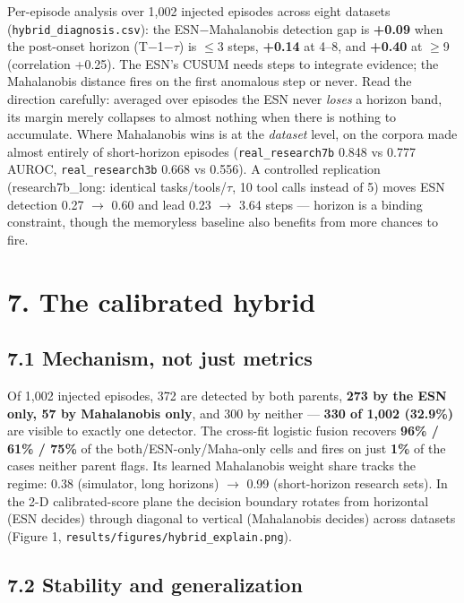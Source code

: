 \documentclass[11pt]{article}
\begin{document}
Per-episode analysis over 1,002 injected episodes across eight datasets (\texttt{hybrid\_\allowbreak{}diagnosis.csv}): the ESN$-$Mahalanobis detection gap is \textbf{+0.09} when the post-onset horizon (T$-$1$-$$\tau$) is $\leq$3 steps, \textbf{+0.14} at 4--8, and \textbf{+0.40} at $\geq$9 (correlation +0.25). The ESN's CUSUM needs steps to integrate evidence; the Mahalanobis distance fires on the first anomalous step or never. Read the direction carefully: averaged over episodes the ESN never \emph{loses} a horizon band, its margin merely collapses to almost nothing when there is nothing to accumulate. Where Mahalanobis wins is at the \emph{dataset} level, on the corpora made almost entirely of short-horizon episodes (\texttt{real\_\allowbreak{}research7b} 0.848 vs 0.777 AUROC, \texttt{real\_\allowbreak{}research3b} 0.668 vs 0.556). A controlled replication (research7b\_long: identical tasks/tools/$\tau$, 10 tool calls instead of 5) moves ESN detection 0.27 $\rightarrow$ 0.60 and lead 0.23 $\rightarrow$ 3.64 steps --- horizon is a binding constraint, though the memoryless baseline also benefits from more chances to fire.


\section{7. The calibrated hybrid}


\subsection{7.1 Mechanism, not just metrics}


Of 1,002 injected episodes, 372 are detected by both parents, \textbf{273 by the ESN only, 57 by Mahalanobis only}, and 300 by neither --- \textbf{330 of 1,002 (32.9\%)} are visible to exactly one detector. The cross-fit logistic fusion recovers \textbf{96\% / 61\% / 75\%} of the both/ESN-only/Maha-only cells and fires on just \textbf{1\%} of the cases neither parent flags. Its learned Mahalanobis weight share tracks the regime: 0.38 (simulator, long horizons) $\rightarrow$ 0.99 (short-horizon research sets). In the 2-D calibrated-score plane the decision boundary rotates from horizontal (ESN decides) through diagonal to vertical (Mahalanobis decides) across datasets (Figure 1, \texttt{results/\allowbreak{}figures/\allowbreak{}hybrid\_\allowbreak{}explain.png}).


\subsection{7.2 Stability and generalization}
\end{document}
